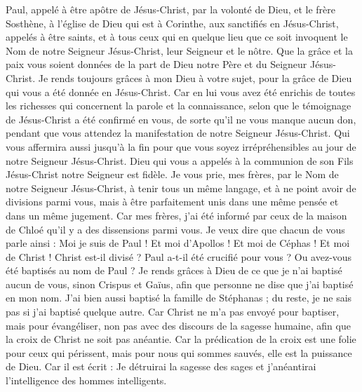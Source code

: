 \begin{multicols}{2}
\VerseOne{}Paul, appelé à être apôtre de Jésus-Christ, par la volonté de Dieu, et le frère Sosthène,
à l'église de Dieu qui est à Corinthe, aux sanctifiés en Jésus-Christ, appelés à être saints, et à tous ceux qui en quelque lieu que ce soit invoquent le Nom de notre Seigneur Jésus-Christ, leur Seigneur et le nôtre.
Que la grâce et la paix vous soient données de la part de Dieu notre Père et du Seigneur Jésus-Christ.
Je rends toujours grâces à mon Dieu à votre sujet, pour la grâce de Dieu qui vous a été donnée en Jésus-Christ.
Car en lui vous avez été enrichis de toutes les richesses qui concernent la parole et la connaissance,
selon que le témoignage de Jésus-Christ a été confirmé en vous,
de sorte qu'il ne vous manque aucun don, pendant que vous attendez la manifestation de notre Seigneur Jésus-Christ.
Qui vous affermira aussi jusqu’à la fin pour que vous soyez irrépréhensibles au jour de notre Seigneur Jésus-Christ.
Dieu qui vous a appelés à la communion de son Fils Jésus-Christ notre Seigneur est fidèle.
Je vous prie, mes frères, par le Nom de notre Seigneur Jésus-Christ, à tenir tous un même langage, et à ne point avoir de divisions parmi vous, mais à être parfaitement unis dans une même pensée et dans un même jugement.
Car mes frères, j’ai été informé par ceux de la maison de Chloé qu'il y a des dissensions parmi vous.
Je veux dire que chacun de vous parle ainsi : Moi je suis de Paul ! Et moi d'Apollos ! Et moi de Céphas ! Et moi de Christ !
Christ est-il divisé ? Paul a-t-il été crucifié pour vous ? Ou avez-vous été baptisés au nom de Paul ?
Je rends grâces à Dieu de ce que je n'ai baptisé aucun de vous, sinon Crispus et Gaïus,
afin que personne ne dise que j'ai baptisé en mon nom.
J'ai bien aussi baptisé la famille de Stéphanas ; du reste, je ne sais pas si j'ai baptisé quelque autre.
Car Christ ne m'a pas envoyé pour baptiser, mais pour évangéliser, non pas avec des discours de la sagesse humaine, afin que la croix de Christ ne soit pas anéantie.
Car la prédication de la croix est une folie pour ceux qui périssent, mais pour nous qui sommes sauvés, elle est la puissance de Dieu.
Car il est écrit : Je détruirai la sagesse des sages et j'anéantirai l'intelligence des hommes intelligents.

\end{multicols}
